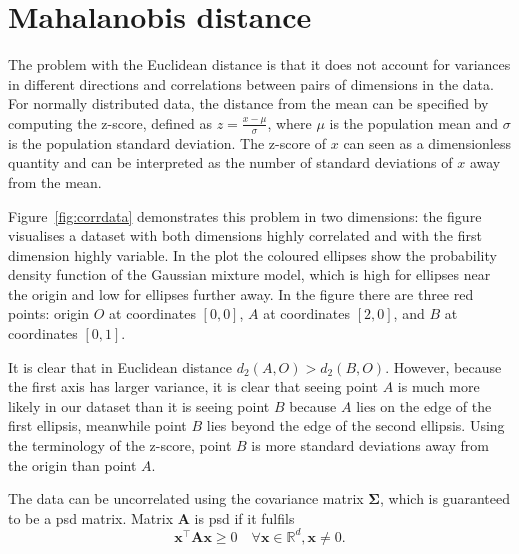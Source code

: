 
\section{Mahalanobis distance} \label{chap:intro:mah}

The problem with the Euclidean distance is that it does not account for variances in different directions and correlations between pairs of dimensions in the data. For normally distributed data, the distance from the mean can be specified by computing the z-score, defined as $z = \frac{x-\mu}{\sigma}$, where $\mu$ is the population mean and $\sigma$ is the population standard deviation. The z-score of $x$ can seen as a dimensionless quantity and can be interpreted as the number of standard deviations of $x$ away from the mean.

Figure~\ref{fig:corrdata} demonstrates this problem in two dimensions: the figure visualises a dataset with both dimensions highly correlated and with the first dimension highly variable. In the plot the coloured ellipses show the probability density function of the Gaussian mixture model, which is high for ellipses near the origin and low for ellipses further away. In the figure there are three red points: 
origin $O$ at coordinates $[0,0]$,
$A$ at coordinates $[2,0]$,
and $B$ at coordinates $[0,1]$.


It is clear that in Euclidean distance $d_2(A,O)>d_2(B,O)$. However, because the first axis has larger variance, it is clear that seeing point $A$ is much more likely in our dataset than it is seeing point $B$ because $A$ lies on the edge of the first ellipsis, meanwhile point $B$ lies beyond the edge of the second ellipsis. Using the terminology of the z-score, point $B$ is more standard deviations away from the origin than point $A$.

The data can be uncorrelated using the covariance matrix $\bm{\Sigma}$, which is guaranteed to be a \ac{psd} matrix. Matrix $\bm{A}$ is \ac{psd} if it fulfils
\begin{equation*}
\bm{x}^\top \bm{A}\bm{x} \geq 0 \quad \forall \bm{x} \in \mathbb{R}^d, \bm{x} \neq 0.
\end{equation*}

